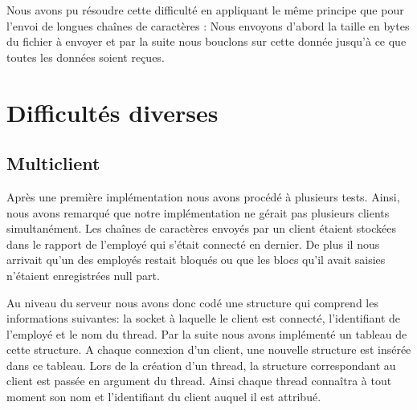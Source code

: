 Nous avons pu résoudre cette difficulté en appliquant le même principe que pour l'envoi de longues chaînes de caractères : Nous envoyons d'abord la taille en bytes du fichier à envoyer et par la suite nous bouclons sur cette donnée jusqu'à ce que toutes les données soient reçues. 

\section{Difficultés diverses }

\subsection{Multiclient}
Après une première implémentation nous avons procédé à plusieurs tests. Ainsi, nous avons remarqué que notre implémentation ne gérait pas plusieurs clients simultanément. Les  chaînes de caractères envoyés par un client étaient stockées dans le rapport de l'employé qui s'était connecté en dernier. De plus il nous arrivait qu'un des employés restait bloqués ou que les blocs qu'il avait saisies n'étaient enregistrées null part.

Au niveau du serveur nous avons donc codé une structure qui comprend les informations suivantes: la socket à laquelle le client est connecté, l'identifiant de l'employé et le nom du thread. Par la suite nous avons implémenté un tableau de cette structure. A chaque connexion d'un client, une nouvelle structure est insérée dans ce tableau. Lors de la création d'un thread, la structure correspondant au client est passée en argument du thread. Ainsi chaque thread connaîtra à tout moment son nom et l'identifiant du client auquel il est attribué. 
 








